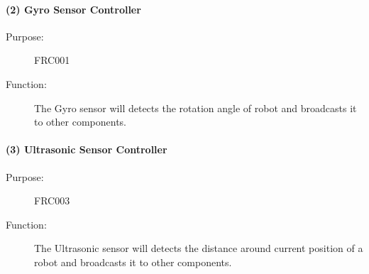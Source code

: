 \documentclass[12pt]{article}
\begin{document}
\paragraph{(2) Gyro Sensor Controller}
\begin{description}
\item [{Purpose:}] FRC001
\item [{Function: }] The Gyro sensor will detects the rotation angle of robot and broadcasts it to other components.
\end{description}

\paragraph{(3) Ultrasonic Sensor Controller}
\begin{description}
\item [{Purpose:}] FRC003
\item [{Function: }] The Ultrasonic sensor will detects the distance around current position of a robot and broadcasts it to other components.
\end{description}


\FloatBarrier
\end{document}
